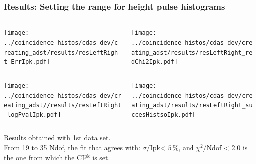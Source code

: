 \documentclass[aspectratio=169]{beamer}
\begin{document}
\begin{frame}
  \frametitle{Results: Setting the range for height pulse histograms}

  \begin{columns}
    \centering
    \begin{column}{0.5\textwidth}
      \texttt{[image: ../coincidence\_histos/cdas\_dev/creating\_adst/results/resLeftRight\_ErrIpk.pdf]}
    \end{column}
    \begin{column}{0.5\textwidth}
      \texttt{[image: ../coincidence\_histos/cdas\_dev/creating\_adst/results/resLeftRight\_redChi2Ipk.pdf]}
    \end{column}
  \end{columns}

  \begin{columns}
    \centering
    \begin{column}{0.5\textwidth}
      \texttt{[image: ../coincidence\_histos/cdas\_dev/creating\_adst//results/resLeftRight\_logPvalIpk.pdf]}
    \end{column}
    \begin{column}{0.5\textwidth}
      \texttt{[image: ../coincidence\_histos/cdas\_dev/creating\_adst/results/resLeftRight\_succesHistsoIpk.pdf]}
    \end{column}
  \end{columns}
  \vspace{0.1cm}

  Results obtained with 1st data set.\\From 19 to 35 Ndof, the
  fit that agrees with: $\sigma/$Ipk< $5$\,\%, and $\chi^2/$Ndof
  < 2.0 is the one from which the CI$^{\mathrm{pk}}$ is set.
\end{frame}
\end{document}
